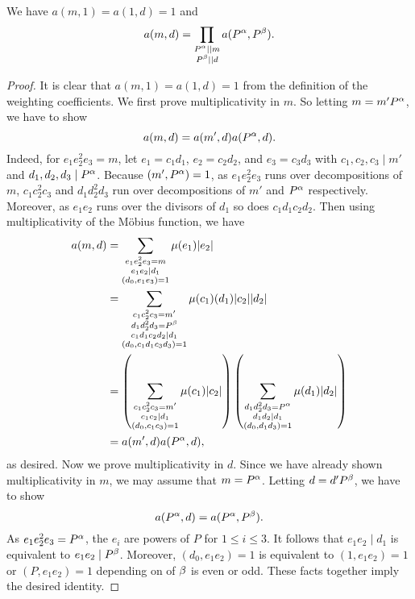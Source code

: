 \documentclass[12pt,reqno,oneside]{amsart}
\begin{document}
    \begin{proposition}\label{prop:multiplicativity_of_weighting_coefficients}
        We have $a(m,1) = a(1,d) = 1$ and
        \[
            a(m,d) = \prod_{\substack{P^{\alpha} \mid\mid m \\ P^{\beta} \mid\mid d}}a(P^{\alpha},P^{\beta}).
        \]
    \end{proposition}
    \begin{proof}
        It is clear that $a(m,1) = a(1,d) = 1$ from the definition of the weighting coefficients. We first prove multiplicativity in $m$. So letting $m = m'P^{\alpha}$, we have to show
        \[
            a(m,d) = a(m',d)a(P^{\alpha},d).
        \]
        Indeed, for $e_{1}e_{2}^{2}e_{3} = m$, let $e_{1} = c_{1}d_{1}$, $e_{2} = c_{2}d_{2}$, and $e_{3} = c_{3}d_{3}$ with $c_{1},c_{2},c_{3} \mid m'$ and $d_{1},d_{2},d_{3} \mid P^{\alpha}$. Because $(m',P^{\alpha}) = 1$, as $e_{1}e_{2}^{2}e_{3}$ runs over decompositions of $m$, $c_{1}c_{2}^{2}c_{3}$ and $d_{1}d_{2}^{2}d_{3}$ run over decompositions of $m'$ and $P^{\alpha}$ respectively. Moreover, as $e_{1}e_{2}$ runs over the divisors of $d_{1}$ so does $c_{1}d_{1}c_{2}d_{2}$. Then using multiplicativity of the M\"obius function, we have
        \begin{align*}
            a(m,d) &= \sum_{\substack{e_{1}e_{2}^{2}e_{3} = m \\ e_{1}e_{2} \mid d_{1} \\ (d_{0},e_{1}e_{3}) = 1}}\mu(e_{1})|e_{2}| \\
            &= \sum_{\substack{c_{1}c_{2}^{2}c_{3} = m' \\ d_{1}d_{2}^{2}d_{3} = P^{\beta} \\ c_{1}d_{1}c_{2}d_{2} \mid d_{1} \\ (d_{0},c_{1}d_{1}c_{3}d_{3}) = 1}}\mu(c_{1})(d_{1})|c_{2}||d_{2}| \\
            &= \left(\sum_{\substack{c_{1}c_{2}^{2}c_{3} = m' \\ c_{1}c_{2} \mid d_{1} \\ (d_{0},c_{1}c_{3}) = 1}}\mu(c_{1})|c_{2}|\right)\left(\sum_{\substack{d_{1}d_{2}^{2}d_{3} = P^{\alpha} \\ d_{1}d_{2} \mid d_{1} \\ (d_{0},d_{1}d_{3}) = 1}}\mu(d_{1})|d_{2}|\right) \\
            &= a(m',d)a(P^{\alpha},d),
        \end{align*}
        as desired. Now we prove multiplicativity in $d$. Since we have already shown multiplicativity in $m$, we may assume that $m = P^{\alpha}$. Letting $d = d'P^{\beta}$, we have to show
        \[
            a(P^{\alpha},d) = a(P^{\alpha},P^{\beta}).
        \]
        As $e_{1}e_{2}^{2}e_{3} = P^{\alpha}$, the $e_{i}$ are powers of $P$ for $1 \le i \le 3$. It follows that $e_{1}e_{2} \mid d_{1}$ is equivalent to $e_{1}e_{2} \mid P^{\beta}$. Moreover, $(d_{0},e_{1}e_{2}) = 1$ is equivalent to $(1,e_{1}e_{2}) = 1$ or $(P,e_{1}e_{2}) = 1$ depending on of $\beta$ is even or odd. These facts together imply the desired identity.
    \end{proof}
\end{document}
